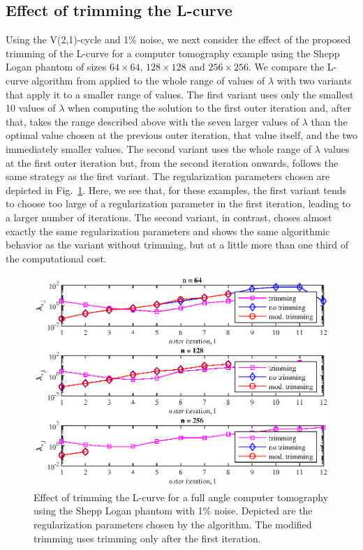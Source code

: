 \subsection{Effect of trimming the L-curve}
\label{ssec:trimming_numerical}
Using the V(2,1)-cycle and 1\% noise, we next consider the effect of the proposed trimming of the L-curve for a computer tomography example using the Shepp Logan phantom of sizes $64 \times 64$, $128 \times 128$ and $256 \times 256$. We compare the L-curve algorithm from \cite{OlearyHansen} applied to the whole range of values of $\lambda$ with two variants that apply it to a smaller range of values. The first variant uses only the smallest 10 values of $\lambda$ when computing the solution to the first outer iteration and, after that, takes the range described above with the seven larger values of $\lambda$ than the optimal value chosen at the previous outer iteration, that value itself, and the two immediately smaller values. The second variant uses the whole range of $\lambda$ values at the first outer iteration but, from the second iteration onwards, follows the same strategy as the first variant. The regularization parameters chosen are depicted in Fig.~\ref{fig:shepp_logan_reg_params_with_and_without_trimming}. Here, we see that, for these examples, the first variant tends to choose too large of a regularization parameter in the first iteration, leading to a larger number of iterations. The second variant, in contrast, choses almost exactly the same regularization parameters and shows the same algorithmic behavior as the variant without trimming, but at a little more than one third of the computational cost.
\begin{figure}[htbp]
\begin{center}
\includegraphics{figures/shepp_logan_reg_params_with_and_without_trimming}
\caption{Effect of trimming the L-curve for a full angle computer tomography using the Shepp Logan phantom with 1\% noise. Depicted are the regularization parameters chosen by the algorithm. The modified trimming uses trimming only after the first iteration.}
\label{fig:shepp_logan_reg_params_with_and_without_trimming}
\end{center}
\end{figure}

